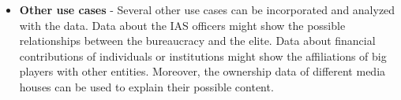 \begin{itemize}
\item \textbf{Other use cases} - Several other use cases can be incorporated and analyzed with the data. Data about the IAS officers might show the possible relationships between the bureaucracy and the elite. Data about financial contributions of individuals or institutions might show the affiliations of big players with other entities. Moreover, the ownership data of different media houses can be used to explain their possible content.

\end{itemize}

